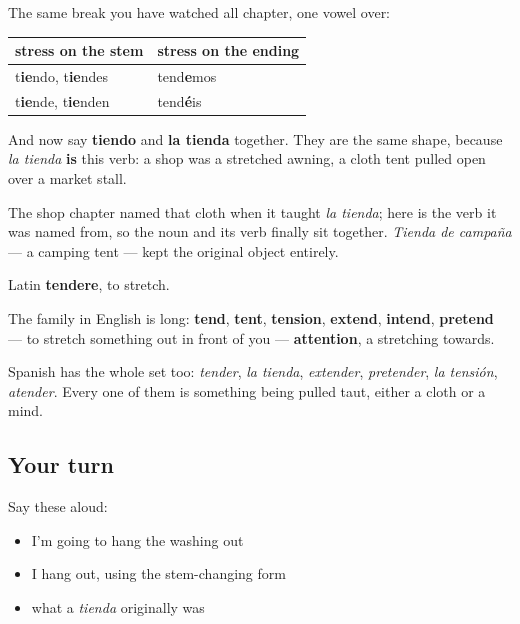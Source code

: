 \begin{grammarlens}[title={Grammar Lens: tender is an e-to-ie verb}]
The same break you have watched all chapter, one vowel over:

\noindent
\begin{tabularx}{\linewidth}{@{}>{\raggedright\arraybackslash}X>{\raggedright\arraybackslash}X@{}}
\toprule
\textbf{stress on the stem} & \textbf{stress on the ending} \\
\midrule
t\textbf{ie}ndo, t\textbf{ie}ndes & tend\textbf{e}mos \\
t\textbf{ie}nde, t\textbf{ie}nden & tend\textbf{é}is \\
\bottomrule
\end{tabularx}

And now say \textbf{tiendo} and \textbf{la tienda} together. They are the same shape, because \emph{la tienda} \textbf{is} this verb: a shop was a stretched awning, a cloth tent pulled open over a market stall.

The shop chapter named that cloth when it taught \emph{la tienda}; here is the verb it was named from, so the noun and its verb finally sit together. \emph{Tienda de campaña} — a camping tent — kept the original object entirely.
\end{grammarlens}

\begin{cousinweb}
Latin \textbf{tendere}, to stretch.

The family in English is long: \textbf{tend}, \textbf{tent}, \textbf{tension}, \textbf{extend}, \textbf{intend}, \textbf{pretend} — to stretch something out in front of you — \textbf{attention}, a stretching towards.

Spanish has the whole set too: \emph{tender}, \emph{la tienda}, \emph{extender}, \emph{pretender}, \emph{la tensión}, \emph{atender}. Every one of them is something being pulled taut, either a cloth or a mind.
\end{cousinweb}

\subsection*{Your turn}
Say these aloud:

\begin{itemize}
\raggedright
  \item I'm going to hang the washing out
  \item I hang out, using the stem-changing form
  \item what a \emph{tienda} originally was
\end{itemize}

